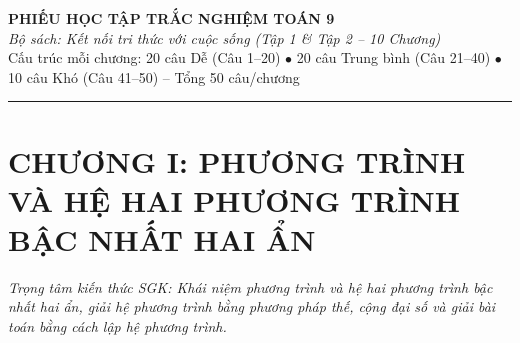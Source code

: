 \documentclass[11pt,a4paper]{article}
\begin{document}
\begin{center}
  {\LARGE\bfseries\color{primary} PHIẾU HỌC TẬP TRẮC NGHIỆM TOÁN 9}\\[4pt]
  {\normalsize\itshape\color{accent} Bộ sách: Kết nối tri thức với cuộc sống (Tập 1 \& Tập 2 – 10 Chương)}\\[4pt]
  {\small Cấu trúc mỗi chương: 20 câu Dễ (Câu 1--20) $\bullet$ 20 câu Trung bình (Câu 21--40) $\bullet$ 10 câu Khó (Câu 41--50) -- Tổng 50 câu/chương}
\end{center}
\vspace{6pt}\hrule\vspace{10pt}
\section*{\color{primary} CHƯƠNG I: PHƯƠNG TRÌNH VÀ HỆ HAI PHƯƠNG TRÌNH BẬC NHẤT HAI ẨN}
\textit{Trọng tâm kiến thức SGK: Khái niệm phương trình và hệ hai phương trình bậc nhất hai ẩn, giải hệ phương trình bằng phương pháp thế, cộng đại số và giải bài toán bằng cách lập hệ phương trình.}\par\vspace{4pt}
\end{document}
